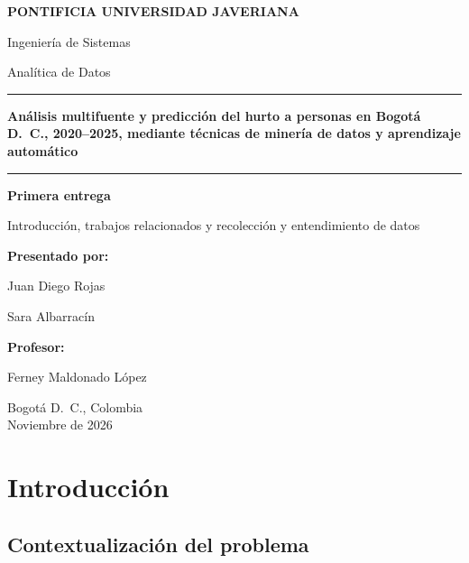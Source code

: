 \documentclass[12pt,letterpaper]{article}
\begin{document}
\begin{titlepage}
  \thispagestyle{empty}
  \begin{center}
    {\large\bfseries PONTIFICIA UNIVERSIDAD JAVERIANA\par}
    \vspace{0.5cm}
    {\large Ingeniería de Sistemas\par}
    \vspace{0.2cm}
    {\large Analítica de Datos\par}
    \vfill
    {\color{azulj}\rule{0.8\textwidth}{1.2pt}\par}
    \vspace{0.6cm}
    {\LARGE\bfseries Análisis multifuente y predicción del hurto a personas en Bogotá D.~C., 2020--2025, mediante técnicas de minería de datos y aprendizaje automático\par}
    \vspace{0.6cm}
    {\color{azulj}\rule{0.8\textwidth}{1.2pt}\par}
    \vspace{0.6cm}
    {\large\bfseries Primera entrega\par}
    {\normalsize Introducción, trabajos relacionados y recolección y entendimiento de datos\par}
    \vfill
    {\large\bfseries Presentado por:\par}
    {\large Juan Diego Rojas\par}
    {\large Sara Albarracín\par}
    \vspace{0.8cm}
    {\large\bfseries Profesor:\par}
    {\large Ferney Maldonado López\par}
    \vfill
    Bogotá D.~C., Colombia\\
    Noviembre de 2026
  \end{center}
\end{titlepage}

\tableofcontents
\newpage

\setcounter{section}{1}
\section{Introducción}

\subsection{Contextualización del problema}
\end{document}
